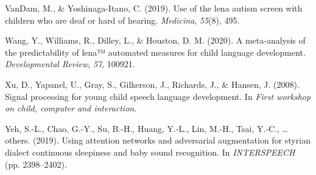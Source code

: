 \documentclass[english,,man,floatsintext]{apa6}
\begin{document}
\leavevmode\hypertarget{ref-vandam2019use}{}%
VanDam, M., \& Yoshinaga-Itano, C. (2019). Use of the lena autism screen with children who are deaf or hard of hearing. \emph{Medicina}, \emph{55}(8), 495.

\leavevmode\hypertarget{ref-wang2020meta}{}%
Wang, Y., Williams, R., Dilley, L., \& Houston, D. M. (2020). A meta-analysis of the predictability of lena™ automated measures for child language development. \emph{Developmental Review}, \emph{57}, 100921.

\leavevmode\hypertarget{ref-xu2008signal}{}%
Xu, D., Yapanel, U., Gray, S., Gilkerson, J., Richards, J., \& Hansen, J. (2008). Signal processing for young child speech language development. In \emph{First workshop on child, computer and interaction}.

\leavevmode\hypertarget{ref-yeh2019using}{}%
Yeh, S.-L., Chao, G.-Y., Su, B.-H., Huang, Y.-L., Lin, M.-H., Tsai, Y.-C., \ldots{} others. (2019). Using attention networks and adversarial augmentation for styrian dialect continuous sleepiness and baby sound recognition. In \emph{INTERSPEECH} (pp. 2398--2402).
\end{document}
